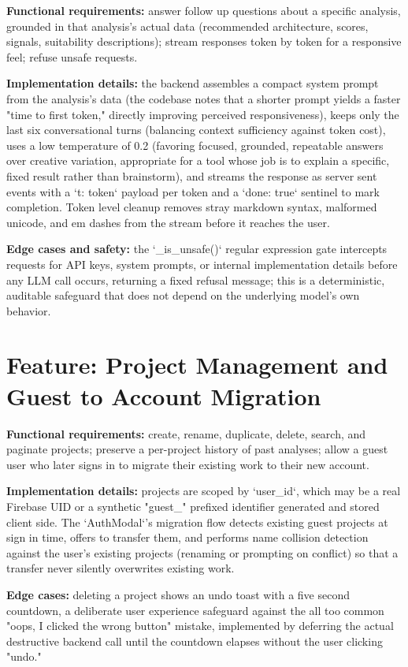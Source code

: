 \documentclass[11pt,a4paper]{report}
\begin{document}
\textbf{Functional requirements:} answer follow up questions about a specific analysis, grounded in that analysis's actual data (recommended architecture, scores, signals, suitability descriptions); stream responses token by token for a responsive feel; refuse unsafe requests.

\textbf{Implementation details:} the backend assembles a compact system prompt from the analysis's data (the codebase notes that a shorter prompt yields a faster "time to first token," directly improving perceived responsiveness), keeps only the last six conversational turns (balancing context sufficiency against token cost), uses a low temperature of 0.2 (favoring focused, grounded, repeatable answers over creative variation, appropriate for a tool whose job is to explain a specific, fixed result rather than brainstorm), and streams the response as server sent events with a `{t: token}` payload per token and a `{done: true}` sentinel to mark completion. Token level cleanup removes stray markdown syntax, malformed unicode, and em dashes from the stream before it reaches the user.

\textbf{Edge cases and safety:} the `_is_unsafe()` regular expression gate intercepts requests for API keys, system prompts, or internal implementation details before any LLM call occurs, returning a fixed refusal message; this is a deterministic, auditable safeguard that does not depend on the underlying model's own behavior.

\section{Feature: Project Management and Guest to Account Migration}

\textbf{Functional requirements:} create, rename, duplicate, delete, search, and paginate projects; preserve a per-project history of past analyses; allow a guest user who later signs in to migrate their existing work to their new account.

\textbf{Implementation details:} projects are scoped by `user_id`, which may be a real Firebase UID or a synthetic "guest\_" prefixed identifier generated and stored client side. The `AuthModal`'s migration flow detects existing guest projects at sign in time, offers to transfer them, and performs name collision detection against the user's existing projects (renaming or prompting on conflict) so that a transfer never silently overwrites existing work.

\textbf{Edge cases:} deleting a project shows an undo toast with a five second countdown, a deliberate user experience safeguard against the all too common "oops, I clicked the wrong button" mistake, implemented by deferring the actual destructive backend call until the countdown elapses without the user clicking "undo."
\end{document}
